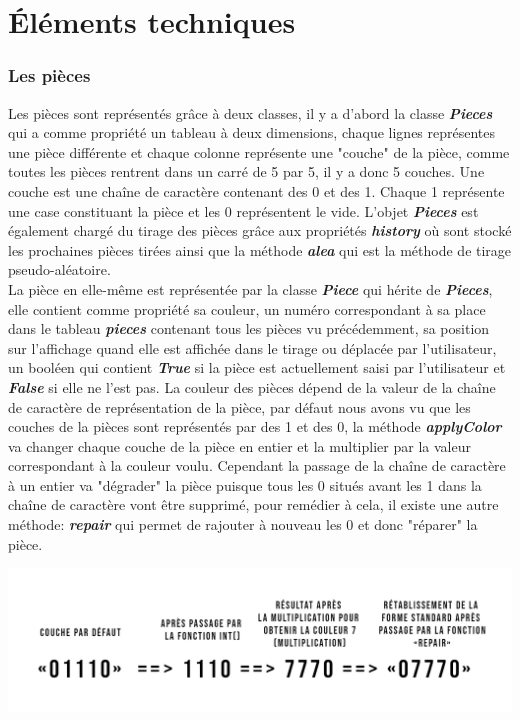 \documentclass[a4paper]{report}
\begin{document}
\part{Éléments techniques}

\section{Les pièces}
Les pièces sont représentés grâce à deux classes, il y a d'abord la classe \textbf{\textit{Pieces}} qui a comme propriété un tableau à deux dimensions, chaque lignes représentes une pièce différente et chaque colonne représente une "couche" de la pièce, comme toutes les pièces rentrent dans un carré de 5 par 5, il y a donc 5 couches. Une couche est une chaîne de caractère contenant des 0 et des 1. Chaque 1 représente une case constituant la pièce et les 0 représentent le vide. L'objet \textbf{\textit{Pieces}} est également chargé du tirage des pièces grâce aux propriétés \textbf{\textit{history}} où sont stocké les prochaines pièces tirées ainsi que la méthode \textbf{\textit{alea}} qui est la méthode de tirage pseudo-aléatoire. \\

La pièce en elle-même est représentée par la classe \textbf{\textit{Piece}} qui hérite de \textbf{\textit{Pieces}}, elle contient comme propriété sa couleur, un numéro correspondant à sa place dans le tableau \textbf{\textit{pieces}} contenant tous les pièces vu précédemment, sa position sur l'affichage quand elle est affichée dans le tirage ou déplacée par l'utilisateur, un booléen qui contient \textbf{\textit{True}} si la pièce est actuellement saisi par l'utilisateur et \textbf{\textit{False}} si elle ne l'est pas. La couleur des pièces dépend de la valeur de la chaîne de caractère de représentation de la pièce, par défaut nous avons vu que les couches de la pièces sont représentés par des 1 et des 0, la méthode \textbf{\textit{applyColor}} va changer chaque couche de la pièce en entier et la multiplier par la valeur correspondant à la couleur voulu. Cependant la passage de la chaîne de caractère à un entier va "dégrader" la pièce puisque tous les 0 situés avant les 1 dans la chaîne de caractère vont être supprimé, pour remédier à cela, il existe une autre méthode: \textbf{\textit{repair}} qui permet de rajouter à nouveau les 0 et donc "réparer" la pièce.

\includegraphics{images/schema_piece.png}
\end{document}
